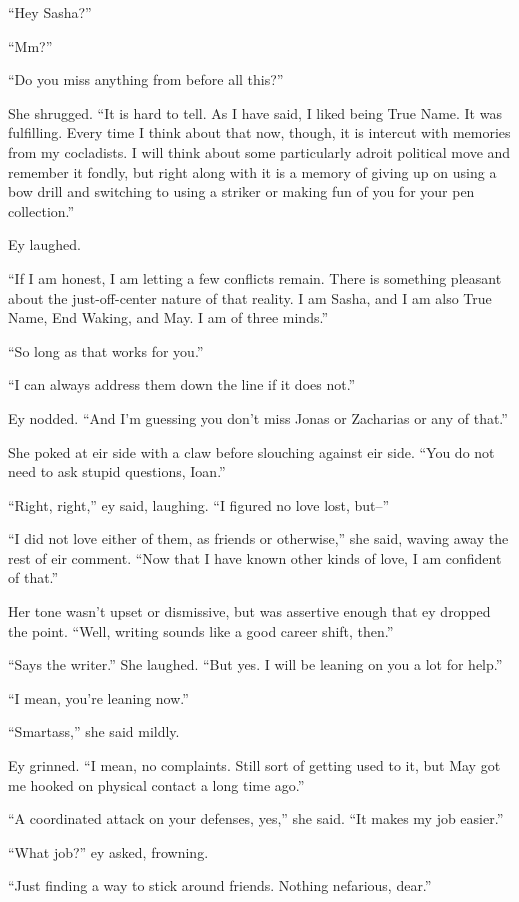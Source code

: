 ``Hey Sasha?''

``Mm?''

``Do you miss anything from before all this?''

She shrugged. ``It is hard to tell. As I have said, I liked being True Name. It was fulfilling. Every time I think about that now, though, it is intercut with memories from my cocladists. I will think about some particularly adroit political move and remember it fondly, but right along with it is a memory of giving up on using a bow drill and switching to using a striker or making fun of you for your pen collection.''

Ey laughed.

``If I am honest, I am letting a few conflicts remain. There is something pleasant about the just-off-center nature of that reality. I am Sasha, and I am also True Name, End Waking, and May. I am of three minds.''

``So long as that works for you.''

``I can always address them down the line if it does not.''

Ey nodded. ``And I'm guessing you don't miss Jonas or Zacharias or any of that.''

She poked at eir side with a claw before slouching against eir side. ``You do not need to ask stupid questions, Ioan.''

``Right, right,'' ey said, laughing. ``I figured no love lost, but--''

``I did not love either of them, as friends or otherwise,'' she said, waving away the rest of eir comment. ``Now that I have known other kinds of love, I am confident of that.''

Her tone wasn't upset or dismissive, but was assertive enough that ey dropped the point. ``Well, writing sounds like a good career shift, then.''

``Says the writer.'' She laughed. ``But yes. I will be leaning on you a lot for help.''

``I mean, you're leaning now.''

``Smartass,'' she said mildly.

Ey grinned. ``I mean, no complaints. Still sort of getting used to it, but May got me hooked on physical contact a long time ago.''

``A coordinated attack on your defenses, yes,'' she said. ``It makes my job easier.''

``What job?'' ey asked, frowning.

``Just finding a way to stick around friends. Nothing nefarious, dear.''

